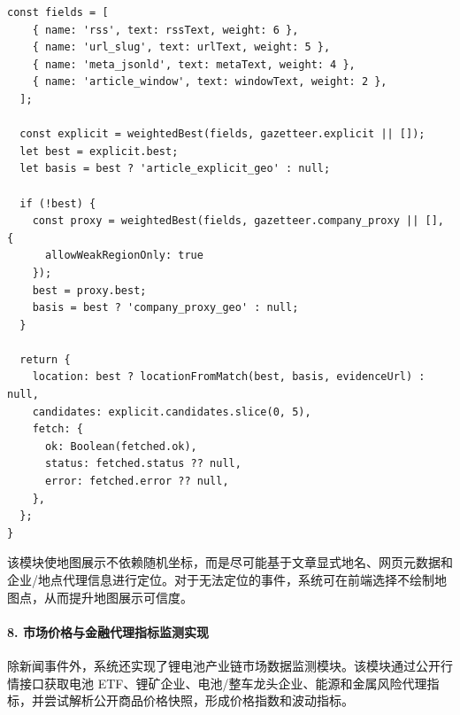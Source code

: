﻿\documentclass[12pt,a4paper]{article}
\begin{document}
\begin{lstlisting}[style=projectcode,caption={新闻地理位置抽取与地图定位增强}]
  const fields = [
    { name: 'rss', text: rssText, weight: 6 },
    { name: 'url_slug', text: urlText, weight: 5 },
    { name: 'meta_jsonld', text: metaText, weight: 4 },
    { name: 'article_window', text: windowText, weight: 2 },
  ];

  const explicit = weightedBest(fields, gazetteer.explicit || []);
  let best = explicit.best;
  let basis = best ? 'article_explicit_geo' : null;

  if (!best) {
    const proxy = weightedBest(fields, gazetteer.company_proxy || [], {
      allowWeakRegionOnly: true
    });
    best = proxy.best;
    basis = best ? 'company_proxy_geo' : null;
  }

  return {
    location: best ? locationFromMatch(best, basis, evidenceUrl) : null,
    candidates: explicit.candidates.slice(0, 5),
    fetch: {
      ok: Boolean(fetched.ok),
      status: fetched.status ?? null,
      error: fetched.error ?? null,
    },
  };
}
\end{lstlisting}

该模块使地图展示不依赖随机坐标，而是尽可能基于文章显式地名、网页元数据和企业/地点代理信息进行定位。对于无法定位的事件，系统可在前端选择不绘制地图点，从而提升地图展示可信度。

\paragraph{8. 市场价格与金融代理指标监测实现}

除新闻事件外，系统还实现了锂电池产业链市场数据监测模块。该模块通过公开行情接口获取电池 ETF、锂矿企业、电池/整车龙头企业、能源和金属风险代理指标，并尝试解析公开商品价格快照，形成价格指数和波动指标。
\end{document}
